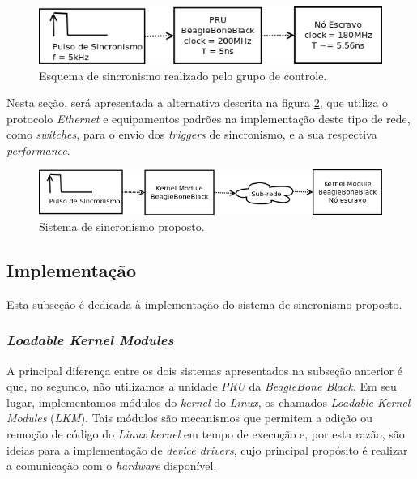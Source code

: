 \FloatBarrier

\begin{figure}[h]

\centering
\includegraphics[scale=0.65]{image/pru_bbb_sincronismo}
\caption {Esquema de sincronismo realizado pelo grupo de controle.}
\label{fig:pru_sincronismo}
\end{figure}

\FloatBarrier

Nesta seção, será apresentada a alternativa descrita na figura
\ref{fig:pru_sincronismo_ethernet}, que utiliza o protocolo \textit{Ethernet} e
equipamentos padrões na implementação deste tipo de rede, como
\textit{switches}, para o envio dos \textit{triggers} de sincronismo, e a sua
respectiva \textit{performance}.

\FloatBarrier

\begin{figure}[h]

\centering
\includegraphics[scale=0.65]{image/pru_bbb_sincronismo_ethernet}
\caption {Sistema de sincronismo proposto.}
\label{fig:pru_sincronismo_ethernet}
\end{figure}

\FloatBarrier

\subsection {Implementação}

Esta subseção é dedicada à implementação do sistema de sincronismo proposto.

\subsubsection{\textit{Loadable Kernel Modules}}

A principal diferença entre os dois sistemas apresentados na subseção anterior é
que, no segundo, não utilizamos a unidade \textit{PRU} da \textit{BeagleBone
Black}. Em seu lugar, implementamos módulos do \textit{kernel} do
\textit{Linux}, os chamados \textit{Loadable Kernel Modules} (\textit{LKM}).
Tais módulos são mecanismos que permitem a adição ou remoção de código do \textit{Linux kernel}
em tempo de execução e, por esta razão, são ideias para a implementação de
\textit{device drivers}, cujo principal propósito é realizar a comunicação com o
\textit{hardware} disponível. 

